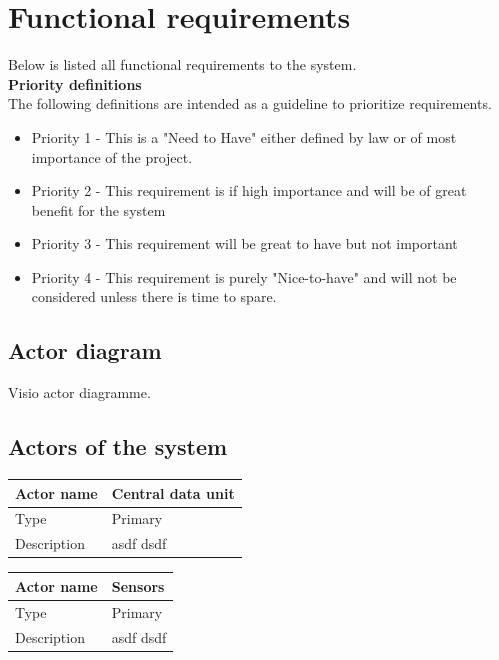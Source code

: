 \section{Functional requirements}
Below is listed all functional requirements to the system.\\
\textbf{\large{Priority definitions}}\\
The following definitions are intended as a guideline to prioritize requirements.
\begin{itemize}[noitemsep,nolistsep]
\item Priority 1 - This is a "Need to Have" either defined by law or of most importance of the project.
\item Priority 2 - This requirement is if high importance and will be of great benefit for the system
\item Priority 3 - This requirement will be great to have but not important
\item Priority 4 - This requirement is purely "Nice-to-have" and will not be considered unless there is time to spare.
\end{itemize}

\subsection{Actor diagram}
Visio actor diagramme.

\subsection{Actors of the system}
\begin{table}[H]
	\centering
	\begin{tabular}{|l|p{7cm}|}
	\hline
	Actor name & Central data unit \\ \hline
	Type & Primary \\ \hline
	Description & asdf dsdf \\ \hline
	\end{tabular}
\end{table}

\begin{table}[H]
	\centering
	\begin{tabular}{|l|p{7cm}|}
	\hline
	Actor name & Sensors \\ \hline
	Type & Primary \\ \hline
	Description & asdf dsdf \\ \hline
	\end{tabular}
\end{table}

